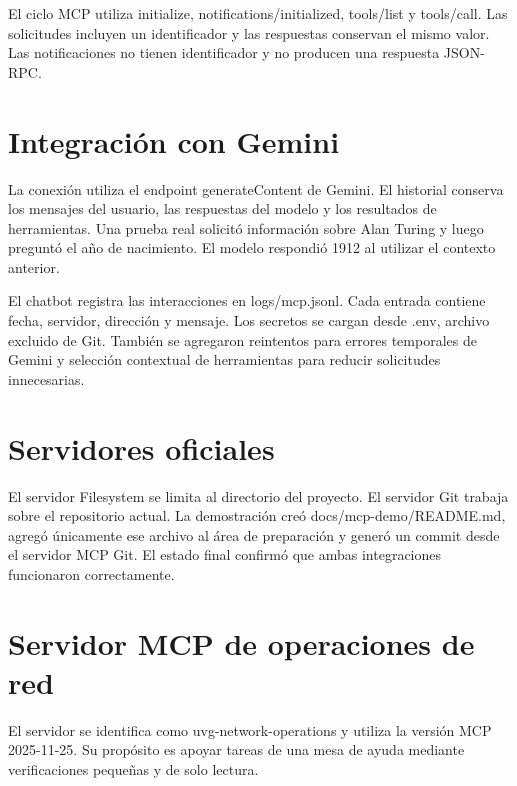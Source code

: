 \documentclass[12pt]{article}
\begin{document}
El ciclo MCP utiliza initialize, notifications/initialized, tools/list y tools/call. Las solicitudes incluyen un identificador y las respuestas conservan el mismo valor. Las notificaciones no tienen identificador y no producen una respuesta JSON-RPC.

\section{Integración con Gemini}

La conexión utiliza el endpoint generateContent de Gemini. El historial conserva los mensajes del usuario, las respuestas del modelo y los resultados de herramientas. Una prueba real solicitó información sobre Alan Turing y luego preguntó el año de nacimiento. El modelo respondió 1912 al utilizar el contexto anterior.

El chatbot registra las interacciones en logs/mcp.jsonl. Cada entrada contiene fecha, servidor, dirección y mensaje. Los secretos se cargan desde .env, archivo excluido de Git. También se agregaron reintentos para errores temporales de Gemini y selección contextual de herramientas para reducir solicitudes innecesarias.

\section{Servidores oficiales}

El servidor Filesystem se limita al directorio del proyecto. El servidor Git trabaja sobre el repositorio actual. La demostración creó docs/mcp-demo/README.md, agregó únicamente ese archivo al área de preparación y generó un commit desde el servidor MCP Git. El estado final confirmó que ambas integraciones funcionaron correctamente.

\section{Servidor MCP de operaciones de red}

El servidor se identifica como uvg-network-operations y utiliza la versión MCP 2025-11-25. Su propósito es apoyar tareas de una mesa de ayuda mediante verificaciones pequeñas y de solo lectura.
\end{document}
